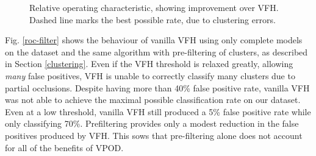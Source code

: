 \documentclass[letterpaper, 10pt, conference]{ieeeconf}
\begin{document}
\begin{figure}[t]
	\hfil
	\vspace{-5pt}
	\caption{Relative operating characteristic, showing improvement over VFH. Dashed line marks the best possible rate, due to clustering errors.}
	\vspace{-15pt}
\end{figure}

Fig. \ref{roc-filter} shows the behaviour of vanilla VFH using only complete
models on the dataset and the same algorithm with pre-filtering of clusters, as described in Section \ref{clustering}. 
Even if the VFH threshold is relaxed greatly, allowing \emph{many} false
positives, VFH is unable to correctly classify many clusters due to partial
occlusions. Despite having more than 40\% false positive rate, vanilla VFH was
not able to achieve the maximal possible classification rate on our dataset. Even at a low threshold,
 vanilla VFH still produced a 5\% false positive rate while only
classifying 70\%. Prefiltering provides only a modest reduction in the false positives produced by VFH. 
This sows that pre-filtering alone does not account for all of the benefits of
VPOD.
\end{document}
